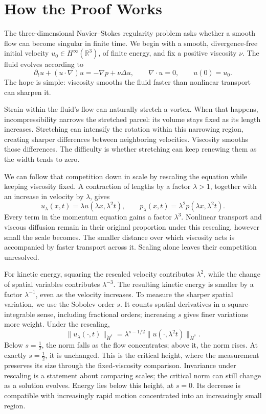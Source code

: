 \begingroup
\setlength{\parindent}{0pt}
\setlength{\parskip}{0.45\baselineskip}
\setlength{\abovedisplayskip}{7pt plus 1.5pt minus 1.5pt}
\setlength{\belowdisplayskip}{7pt plus 1.5pt minus 1.5pt}
\setlength{\jot}{5pt}

\section*{How the Proof Works}

The three-dimensional Navier--Stokes regularity problem asks whether a smooth
flow can become singular in finite time. We begin with a smooth,
divergence-free initial velocity \(u_0\in H^\infty(\mathbb R^3)\), of finite
energy, and fix a positive viscosity \(\nu\). The fluid evolves according to
\[
 \partial_tu+(u\!\cdot\nabla)u=-\nabla p+\nu\Delta u,
 \qquad \nabla\cdot u=0,
 \qquad u(0)=u_0.
\]
The hope is simple: viscosity smooths the fluid faster than nonlinear transport can sharpen it.

Strain within the fluid's flow can naturally stretch a vortex. When that
happens, incompressibility narrows the stretched parcel: its volume stays
fixed as its length increases. Stretching can intensify the rotation within
this narrowing region, creating sharper differences between neighboring
velocities. Viscosity smooths those differences. The difficulty is whether
stretching can keep renewing them as the width tends to zero.

We can follow that competition down in scale by rescaling the equation while
keeping viscosity fixed. A contraction of lengths by a factor \(\lambda>1\),
together with an increase in velocity by \(\lambda\), gives
\[
 u_\lambda(x,t)=\lambda u(\lambda x,\lambda^2t),
 \qquad
 p_\lambda(x,t)=\lambda^2p(\lambda x,\lambda^2t).
\]
Every term in the momentum equation gains a factor \(\lambda^3\). Nonlinear
transport and viscous diffusion remain in their original proportion under
this rescaling, however small the scale becomes. The smaller distance over
which viscosity acts is accompanied by faster transport across it. Scaling
alone leaves their competition unresolved.

For kinetic energy, squaring the rescaled velocity contributes
\(\lambda^2\), while the change of spatial variables contributes
\(\lambda^{-3}\). The resulting kinetic energy is smaller by a factor
\(\lambda^{-1}\), even as the velocity increases. To measure the
sharper spatial variation, we use the Sobolev order \(s\). It counts spatial
derivatives in a square-integrable sense, including fractional orders;
increasing \(s\) gives finer variations more weight. Under the rescaling,
\[
 \|u_\lambda(\cdot,t)\|_{\dot H^s}
 =\lambda^{s-1/2}\|u(\cdot,\lambda^2t)\|_{\dot H^s}.
\]
Below \(s=\tfrac12\), the norm falls as the flow concentrates; above it, the
norm rises. At exactly \(s=\tfrac12\), it is unchanged. This is the critical
height, where the measurement preserves its size through the fixed-viscosity
comparison. Invariance under rescaling is a statement about comparing scales;
the critical norm can still change as a solution evolves. Energy lies below
this height, at \(s=0\). Its decrease is compatible with increasingly rapid
motion concentrated into an increasingly small region.


